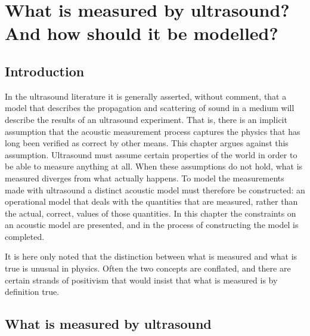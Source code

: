 

\chapter{What is measured by ultrasound?\\And how should it be modelled?}\label{ch:observables}



\section{Introduction}
In the ultrasound literature it is generally asserted, without comment,
that a model that describes the propagation and scattering of sound in a medium will describe the results of an ultrasound experiment.
That is, there is an implicit assumption that the acoustic measurement process captures the physics
that has long been verified as correct by other means. %
This chapter argues against this assumption.
Ultrasound must assume certain properties of the world in order to be able to measure anything at all.
When these assumptions do not hold, what is measured diverges from what actually happens.
To model the measurements made with ultrasound a distinct acoustic model must therefore be constructed:
an operational model that deals with the quantities that are measured,
rather than the actual, correct, values of those quantities. 
In this chapter the constraints on an acoustic model are presented,
and in  the process of constructing the model is completed.

It is here only noted that the distinction between what is measured and what is true is unusual in physics.
Often the two concepts are conflated,
and there are certain strands of positivism that would insist that what is measured is by definition true.


\section{What is measured by ultrasound}\label{sec:measurement}



